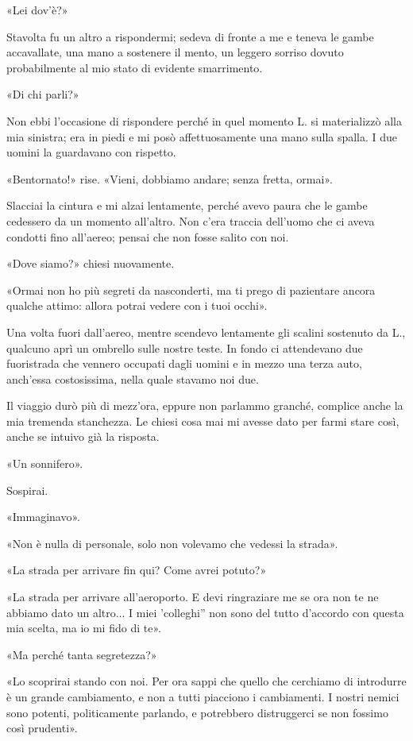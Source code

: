 \documentclass[a4paper,12pt]{book}
\begin{document}
«Lei dov'è?»

Stavolta fu un altro a rispondermi; sedeva di fronte a me e teneva le gambe
accavallate, una mano a sostenere il mento, un leggero sorriso dovuto
probabilmente al mio stato di evidente smarrimento.

«Di chi parli?»

Non ebbi l'occasione di rispondere perché in quel momento L. si
materializzò alla mia sinistra; era in piedi e mi posò affettuosamente una
mano sulla spalla. I due uomini la guardavano con rispetto.

«Bentornato!» rise. «Vieni, dobbiamo andare; senza fretta, ormai».

Slacciai la cintura e mi alzai lentamente, perché avevo paura che le gambe
cedessero da un momento all'altro. Non c'era traccia dell'uomo che ci
aveva condotti fino all'aereo; pensai che non fosse salito con noi.

«Dove siamo?» chiesi nuovamente.

«Ormai non ho più segreti da nasconderti, ma ti prego di pazientare ancora
qualche attimo: allora potrai vedere con i tuoi occhi».

Una volta fuori dall'aereo, mentre scendevo lentamente gli scalini sostenuto
da L., qualcuno aprì un ombrello sulle nostre teste. In fondo ci attendevano due
fuoristrada che vennero occupati dagli uomini e in mezzo una terza auto,
anch'essa costosissima, nella quale stavamo noi due.

Il viaggio durò più di mezz'ora, eppure non parlammo granché, complice anche la
mia tremenda stanchezza. Le chiesi cosa mai mi avesse dato per farmi stare così,
anche se intuivo già la risposta.

«Un sonnifero».

Sospirai.

«Immaginavo».

«Non è nulla di personale, solo non volevamo che vedessi la strada».

«La strada per arrivare fin qui? Come avrei potuto?»

«La strada per arrivare all'aeroporto. E devi ringraziare me se ora non te ne
abbiamo dato un altro... I miei 'colleghi'' non sono del tutto d'accordo
con questa mia scelta, ma io mi fido di te».

«Ma perché tanta segretezza?»

«Lo scoprirai stando con noi. Per ora sappi che quello che cerchiamo di
introdurre è un grande cambiamento, e non a tutti piacciono i cambiamenti. I
nostri nemici sono potenti, politicamente parlando, e potrebbero distruggerci se
non fossimo così prudenti».
\end{document}
